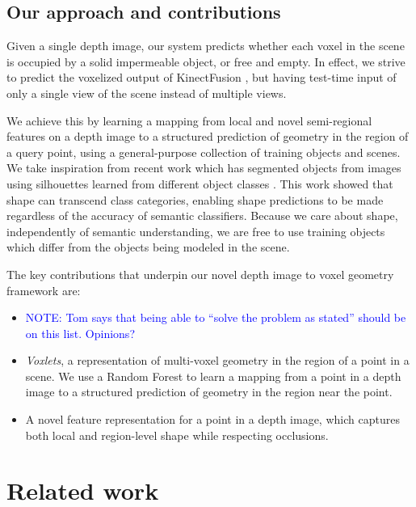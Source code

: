 \documentclass[10pt,twocolumn,letterpaper]{article}
\newcommand{\note}[1]{\textcolor{blue}{NOTE: #1}}
\begin{document}
\subsection{Our approach and contributions}

Given a single depth image, our system predicts whether each voxel in the scene is occupied by a solid impermeable object, or free and empty.
In effect, we strive to predict the voxelized output of KinectFusion \cite{izadi-uist-2011}, but having test-time input of only a single view of the scene instead of multiple views.

We achieve this by learning a mapping from local and novel semi-regional features on a depth image to a structured prediction of geometry in the region of a query point, using a general-purpose collection of training objects and scenes.
We take inspiration from recent work which has segmented objects from images using silhouettes learned from different object classes \cite{kim-eccv-2012}.
This work showed that shape can transcend class categories, enabling shape predictions to be made regardless of the accuracy of semantic classifiers.
Because we care about shape, independently of semantic understanding, we are free to use training objects which differ from the objects being modeled in the scene.

The key contributions that underpin our novel depth image to voxel geometry framework are:
\begin{itemize}
\item \note{Tom says that being able to ``solve the problem as stated'' should be on this list. Opinions?}
\item \emph{Voxlets}, a representation of multi-voxel geometry in the region of a point in a scene. 
We use a Random Forest to learn a mapping from a point in a depth image to a structured prediction of geometry in the region near the point.
\item A novel feature representation for a point in a depth image, which captures both local and region-level shape while respecting occlusions.
\end{itemize}


\section{Related work}
\end{document}
